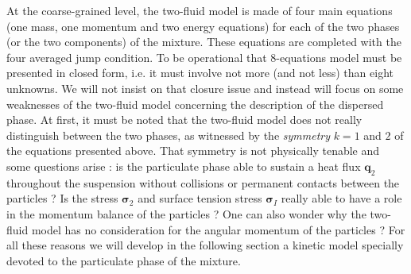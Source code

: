 At the coarse-grained level, the two-fluid model is made of four main equations
(one mass, one momentum and two energy equations) for each of the two phases
(or the two components) of the mixture. 
These equations are completed with the four averaged jump condition.  
To be operational that 8-equations
model must be presented in closed form, i.e. it must involve not more (and
not less) than eight unknowns. 
We will not insist on that closure issue and
instead will focus on some weaknesses of the two-fluid model concerning the
description of the dispersed phase. 
At first, it must be noted that the two-fluid model does not really distinguish between the two phases, as witnessed by the
\textit{symmetry} $k = 1$ and $2$ of the equations presented above. That symmetry
is not physically tenable and some questions arise : is the particulate phase
able to sustain a heat flux $\textbf{q}_2$ throughout the suspension without collisions or permanent contacts between the particles ? Is the stress $\bm{\sigma}_2$ and surface tension stress $\bm{\sigma}_I$ really able to have a role in the momentum balance of the particles ? 
One can also wonder why the two-fluid model has no consideration for the angular momentum of the particles ? 
For all these reasons we will develop in the following section a kinetic model
specially devoted to the particulate phase of the mixture.
